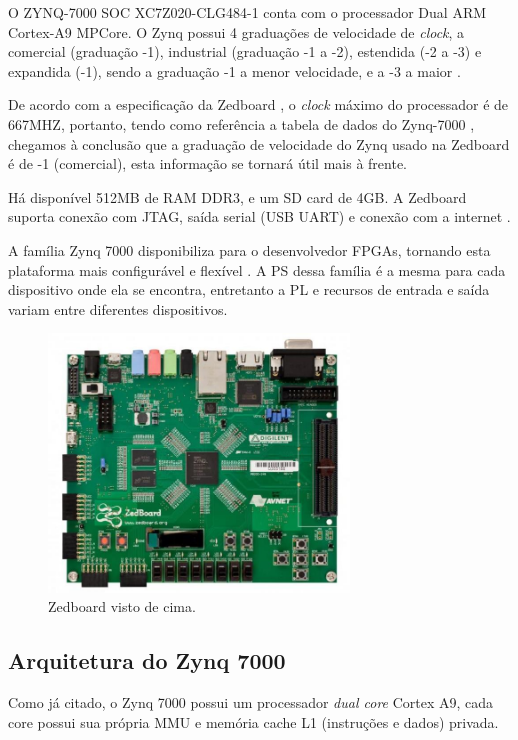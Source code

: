 O ZYNQ-7000 SOC XC7Z020-CLG484-1 conta com o processador Dual ARM Cortex-A9 MPCore. O Zynq possui 4 graduações de velocidade de \emph{clock}, a comercial (graduação -1), industrial (graduação -1 a -2), estendida (-2 a -3) e expandida (-1), sendo a graduação -1 a menor velocidade, e a -3 a maior \cite{product_table}.

De acordo com a especificação da Zedboard \cite{zedboard}, o \emph{clock} máximo do processador é de 667MHZ, portanto, tendo como referência a tabela de dados do Zynq-7000 \cite[p.~13]{data_sheet}, chegamos à conclusão que a graduação de velocidade do Zynq usado na Zedboard é de -1 (comercial), esta informação se tornará útil mais à frente.

Há disponível 512MB de RAM DDR3, e um SD card de 4GB. A Zedboard suporta conexão com JTAG, saída serial (USB UART) e conexão com a internet \cite{xilinx}.

A família Zynq 7000 disponibiliza para o desenvolvedor FPGAs, tornando esta plataforma mais configurável e flexível \cite[p.~26]{ug585}. A PS dessa família é a mesma para cada dispositivo onde ela se encontra, entretanto a PL e recursos de entrada e saída variam entre diferentes dispositivos. 


\begin{figure}[ht!]
	\label{fig:zed}
    \centering
    \includegraphics[width=8cm]{figuras/zedboard}
    \caption{Zedboard visto de cima.}
\end{figure}

\subsection{Arquitetura do Zynq 7000}
Como já citado, o Zynq 7000 possui um processador \emph{dual core} Cortex A9, cada core possui sua própria MMU e memória cache L1 (instruções e dados) privada.

